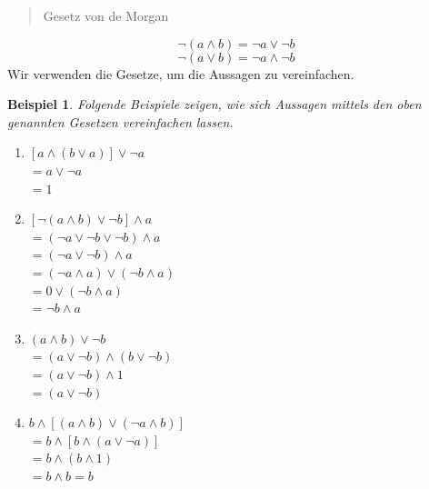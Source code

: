 \documentclass{report}
\newtheorem{myexample}{Beispiel}
\begin{document}
\begin{quote}Gesetz von de Morgan\end{quote}
\begin{equation}\lnot (a \land b) = \lnot a \lor \lnot b\end{equation}
\begin{equation}\lnot (a \lor b) = \lnot a \land \lnot b\end{equation}
Wir verwenden die Gesetze, um die Aussagen zu vereinfachen.
\begin{myexample}Folgende Beispiele zeigen, wie sich Aussagen mittels den oben genannten Gesetzen vereinfachen lassen.
\begin{enumerate}
\item $[a \land (b \lor a)] \lor \lnot a$\\
$= a \lor \lnot a$\\
$= 1$
\item $[\lnot (a \land b) \lor \lnot b] \land a$\\
$= (\lnot a \lor \lnot b \lor \lnot b) \land a$\\
$= (\lnot a \lor \lnot b) \land a$\\
$= (\lnot a \land a) \lor (\lnot b \land a)$\\
$= 0 \lor (\lnot b \land a)$\\
$= \lnot b \land a$
\item $(a \land b) \lor \lnot b$\\
$= (a \lor \lnot b) \land (b \lor \lnot b)$\\
$= (a \lor \lnot b) \land 1$\\
$= (a \lor \lnot b)$
\item $b \land [(a \land b) \lor ( \lnot a \land b)]$\\
$= b \land [b \land (a \lor \lnot a)]$\\
$= b \land (b \land 1)$\\
$= b \land b = b$
\end{enumerate}
\end{myexample}
\end{document}
